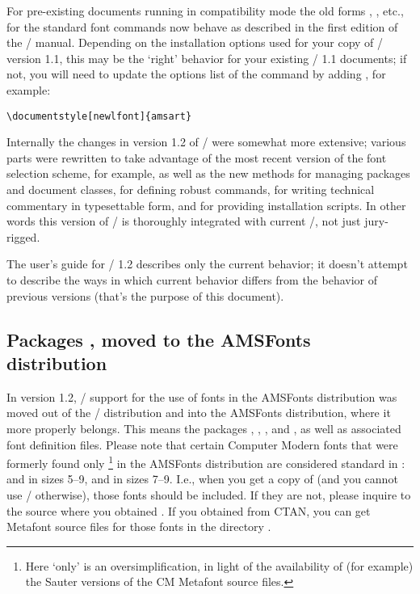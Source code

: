 \documentclass{amsdtx}
\begin{document}
For pre-existing documents running in compatibility mode the old forms
, , etc., for the standard font commands now behave as
described in the first edition of the \latex/ manual. Depending on the
installation options used for your copy of \amslatex/ version 1.1, this
may be the `right' behavior for your existing \amslatex/ 1.1 documents;
if not, you will need to update the options list of the
 command by adding , for example:
\begin{verbatim}
\documentstyle[newlfont]{amsart}
\end{verbatim}

Internally the changes in version 1.2 of \amslatex/ were somewhat more
extensive; various parts were rewritten to take advantage of the most
recent version of the font selection scheme, for example, as well as the
new methods for managing packages and document classes, for defining
robust commands, for writing technical commentary in typesettable form,
and for providing installation scripts. In other words this version of
\amslatex/ is thoroughly integrated with current \latex/, not just
jury-rigged.

The user's guide for \amslatex/ 1.2 describes only the current behavior;
it doesn't attempt to describe the ways in which current behavior
differs from the behavior of previous versions (that's the purpose of
this document).

\subsection{Packages ,  moved to the AMSFonts
distribution}

In version 1.2, \latex/ support for the use of fonts in the AMSFonts
distribution was moved out of the \amslatex/ distribution and into the
AMSFonts distribution, where it more properly belongs. This means the
packages , , , and
, as well as associated font definition files. Please note
that certain Computer Modern fonts that were formerly found only%
\footnote{Here `only' is an oversimplification, in light of the
availability of (for example) the Sauter versions of the CM Metafont
source files.}
in the AMSFonts distribution are considered standard in \LaTeXe{}:
 and  in sizes 5--9, and  in sizes 7--9.
I.e., when you get a copy of \LaTeXe{} (and you cannot use \amslatex/
otherwise), those fonts should be included. If they are not, please
inquire to the source where you obtained \LaTeXe{}. If you obtained
\LaTeXe{} from CTAN, you can get Metafont source files for those fonts
in the directory .
\end{document}
